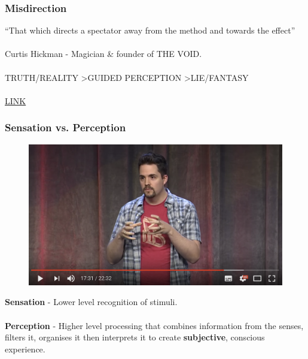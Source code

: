 \begin{frame}
	\frametitle{Misdirection}
	``That which directs a spectator away from the method and towards the effect'' \\~\\
	Curtis Hickman - Magician \& founder of THE VOID. \\~\\
	TRUTH/REALITY \textgreater  GUIDED PERCEPTION \textgreater  LIE/FANTASY \\~\\
	\href{https://www.youtube.com/watch?v=Ebwtq1HZJ2A}{LINK}
\end{frame}


\begin{frame}
	\frametitle{Sensation vs. Perception}	
	\begin{figure}
		\href{https://youtu.be/Ebwtq1HZJ2A?t=1051}{ \includegraphics[scale=.17]{assets/sensation}  }
	\end{figure}
	\textbf{Sensation} - Lower level recognition of stimuli. \\~\\
	\textbf{Perception} - Higher level processing that combines information from the senses, filters it, organises it then interprets it to create \textbf{subjective}, conscious experience. 
\end{frame}











